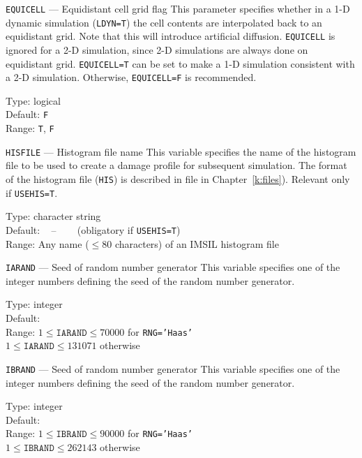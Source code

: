 \begin{keydescription}{\texttt{EQUICELL} --- Equidistant cell grid flag}
%
  This parameter specifies whether in a 1-D dynamic simulation (\texttt{LDYN=T}) 
  the cell contents are interpolated back to an equidistant grid.  Note that
  this will introduce artificial diffusion.  \texttt{EQUICELL} is ignored
  for a 2-D simulation, since 2-D simulations are always done on equidistant
  grid. \texttt{EQUICELL=T} can be set to make a 1-D simulation
  consistent with a 2-D simulation. Otherwise, \texttt{EQUICELL=F} is 
  recommended.
  \begin{keytab}
    Type:    \> logical \\
    Default: \> \texttt{F} \\
    Range:   \> \texttt{T}, \texttt{F} 
  \end{keytab}
\end{keydescription}

\begin{keydescription}{\texttt{HISFILE} --- Histogram file name}
%
  This variable specifies the name of the histogram file to be used to create
  a damage profile for subsequent simulation. The format of the histogram file
  (\texttt{HIS}) is described in file in Chapter~\ref{k:files}). Relevant only
  if \texttt{USEHIS=T}.
%
  \begin{keytab}
    Type:    \> character string \\
    Default: \> ~ -- ~~~ (obligatory if \texttt{USEHIS=T}) \\
    Range:   \> Any name ($\le 80$ characters) of an IMSIL histogram file 
  \end{keytab}
\end{keydescription}

\begin{keydescription}{\texttt{IARAND} --- Seed of random number generator}
%
  This variable specifies one of the integer numbers defining the seed of
  the random number generator.
%
  \begin{keytab}
    Type:    \> integer \\
    Default:  \\
    Range:   \> $1 \le \texttt{IARAND} \le 70000$ for \texttt{RNG='Haas'} \\
             \> $1 \le \texttt{IARAND} \le 131071$ otherwise
  \end{keytab}
\end{keydescription}

\begin{keydescription}{\texttt{IBRAND} --- Seed of random number generator}
%
  This variable specifies one of the integer numbers defining the seed of
  the random number generator.
%
  \begin{keytab}
    Type:    \> integer \\
    Default:  \\
    Range:   \> $1 \le \texttt{IBRAND} \le 90000$ for \texttt{RNG='Haas'} \\
             \> $1 \le \texttt{IBRAND} \le 262143$ otherwise
  \end{keytab}
\end{keydescription}

